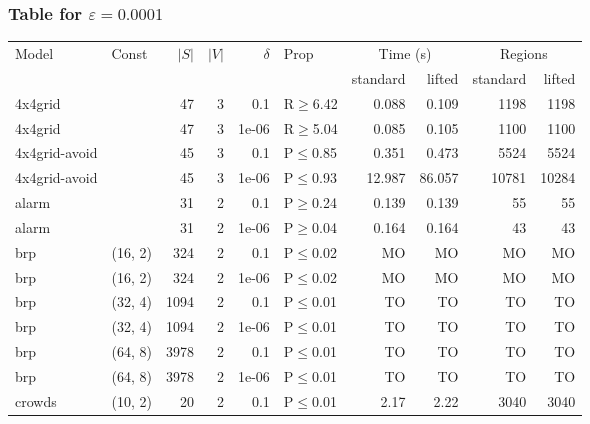 \subsubsection{Table for \(\varepsilon=0.0001\)}
\begin{longtable}{llrrrlrrrr}

        \toprule
        Model & Const & $|S|$ & $|V|$ & $\delta$ & Prop & \multicolumn{2}{c}{Time (s)} & \multicolumn{2}{c}{Regions} \\
        \cmidrule(ll){7-8} \cmidrule(ll){9-10}
        & & & & & & standard & lifted & standard & lifted \\
        \midrule
        
 4x4grid       &           &     	47 &   3 & 0.1   & R$\geq$6.42  & 0.088    & 0.109   & 1198   & 1198   \\
 4x4grid       &           &     	47 &   3 & 1e-06 & R$\geq$5.04  & 0.085    & 0.105   & 1100   & 1100   \\
 4x4grid-avoid &           &     	45 &   3 & 0.1   & P$\leq$0.85  & 0.351    & 0.473   & 5524   & 5524   \\
 4x4grid-avoid &           &     	45 &   3 & 1e-06 & P$\leq$0.93  & 12.987   & 86.057  & 10781  & 10284  \\
 alarm         &           &     	31 &   2 & 0.1   & P$\geq$0.24  & 0.139    & 0.139   & 55     & 55     \\
 alarm         &           &     	31 &   2 & 1e-06 & P$\geq$0.04  & 0.164    & 0.164   & 43     & 43     \\
 brp           & (16, 2)   &    	324 &   2 & 0.1   & P$\leq$0.02  & MO       & MO      & MO     & MO     \\
 brp           & (16, 2)   &    	324 &   2 & 1e-06 & P$\leq$0.02  & MO       & MO      & MO     & MO     \\
 brp           & (32, 4)   &   	1094 &   2 & 0.1   & P$\leq$0.01  & TO       & TO      & TO     & TO     \\
 brp           & (32, 4)   &   	1094 &   2 & 1e-06 & P$\leq$0.01  & TO       & TO      & TO     & TO     \\
 brp           & (64, 8)   &   	3978 &   2 & 0.1   & P$\leq$0.01  & TO       & TO      & TO     & TO     \\
 brp           & (64, 8)   &   	3978 &   2 & 1e-06 & P$\leq$0.01  & TO       & TO      & TO     & TO     \\
 crowds        & (10, 2)   &     	20 &   2 & 0.1   & P$\leq$0.01  & 2.17     & 2.22    & 3040   & 3040   \\

\end{longtable}
